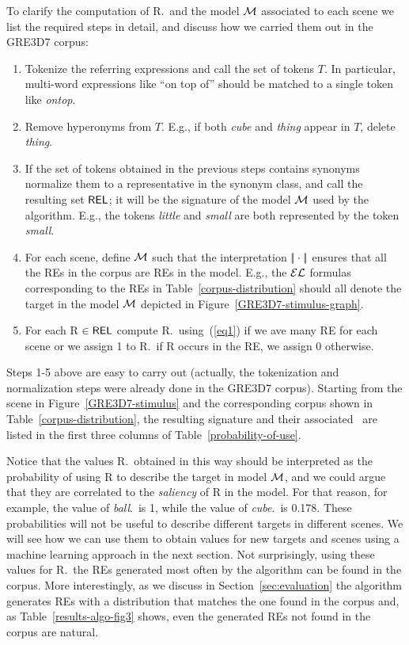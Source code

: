 To clarify the computation of R.\puse\ and the model $\mathcal{M}$ associated
to each scene we list the required steps in detail, and discuss how we
carried them out in the GRE3D7 corpus:

\begin{enumerate}
\item Tokenize the referring expressions and call the set of tokens
  $T$. In particular, multi-word expressions like ``on top of''
  should be matched to a single token like \emph{ontop}.

\item Remove hyperonyms from $T$. E.g., if both \emph{cube} and
  \emph{thing} appear in $T$, delete \emph{thing}.

\item If the set of tokens obtained in the previous steps contains
  synonyms normalize them to a representative in the synonym class,
  and call the resulting set $\textsf{REL}$; it will be the signature of the
  model $\mathcal{M}$ used by the algorithm. E.g., the tokens \emph{little}
  and \emph{small} are both represented by the token \emph{small}.

\item For each scene, define $\mathcal{M}$ such that the interpretation
  $|\!|\cdot|\!|$ ensures that all the REs in the corpus are REs in
  the model.  E.g., the $\mathcal{EL}$ formulas corresponding to the REs in
  Table~\ref{corpus-distribution} should all denote the target in the
  model $\mathcal{M}$ depicted in
  Figure~\ref{GRE3D7-stimulus-graph}.

\item For each R $\in \textsf{REL}$ compute R.\puse\ using~(\ref{eq1}) if we
  ave many RE for each scene or we assign 1 to R.\puse\ if R occurs in
  the RE, we assign 0 otherwise.

\end{enumerate}

Steps 1-5 above are easy to carry out (actually, the tokenization and
normalization steps were already done in the GRE3D7 corpus).  Starting
from the scene in Figure~\ref{GRE3D7-stimulus} and the corresponding
corpus shown in Table~\ref{corpus-distribution}, the resulting
signature and their associated \puse\ are listed in the first three
columns of Table~\ref{probability-of-use}.

Notice that the values R.\puse\ obtained in this way should be
interpreted as the probability of using R to describe the target in
model $\mathcal{M}$, and we could argue that they are correlated to the
\emph{saliency} of R in the model.  For that reason, for example, the
value of \emph{ball}.\puse\ is 1, while the value of
\emph{cube}.\puse\ is 0.178.  These probabilities will not be useful
to describe different targets in different scenes.  We will see how we
can use them to obtain values for new targets and scenes using a
machine learning approach in the next section.  Not surprisingly,
using these values for R.\puse\ the REs generated most often by the
algorithm can be found in the corpus.  More interestingly, as we
discuss in Section~\ref{sec:evaluation} the algorithm generates REs
with a distribution that matches the one found in the corpus and, as
Table~\ref{results-algo-fig3} shows, even the generated REs not found
in the corpus are natural.


